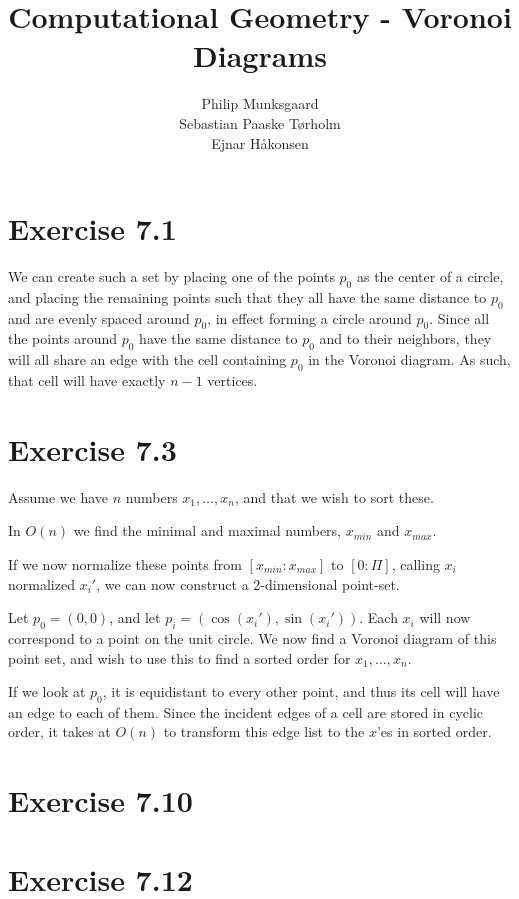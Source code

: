 \documentclass[11pt,a4paper]{article}
\title{Computational Geometry - Voronoi Diagrams}
\author{Philip Munksgaard \\ Sebastian Paaske Tørholm \\ Ejnar Håkonsen}
\begin{document}
\maketitle

\section{Exercise 7.1}

We can create such a set by placing one of the points $p_0$ as the
center of a circle, and placing the remaining points such that they
all have the same distance to $p_0$ and are evenly spaced around
$p_0$, in effect forming a circle around $p_0$. Since all the points
around $p_0$ have the same distance to $p_0$ and to their neighbors,
they will all share an edge with the cell containing $p_0$ in the
Voronoi diagram. As such, that cell will have exactly $n-1$ vertices.

\section{Exercise 7.3}
Assume we have $n$ numbers $x_1, \ldots, x_n$, and that we wish to sort these.

In $O(n)$ we find the minimal and maximal numbers, $x_{min}$
and $x_{max}$.

If we now normalize these points from $[x_{min} : x_{max}]$ to $[0 : \Pi]$, calling
$x_i$ normalized $x_i'$, we can now construct a 2-dimensional point-set.

Let $p_0 = (0,0)$, and let $p_i = (\cos(x_i'), \sin(x_i'))$. Each $x_i$ will
now correspond to a point on the unit circle. We now find a Voronoi diagram of
this point set, and wish to use this to find a sorted order for $x_1, \ldots,
x_n$.

If we look at $p_0$, it is equidistant to every other point, and thus its cell
will have an edge to each of them. Since the incident edges of a cell are
stored in cyclic order, it takes at $O(n)$ to transform this edge list to the
$x$'es in sorted order.

\section{Exercise 7.10}

\section{Exercise 7.12}
\end{document}
